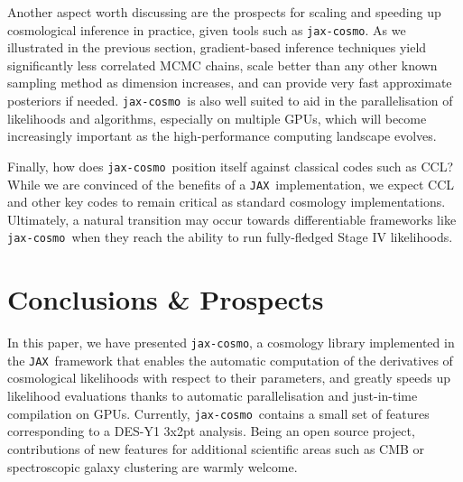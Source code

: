 \documentclass[twocolumn,twocolappendix,nofootinbib,iop]{openjournal}
\newcommand{\jaxcosmo}{\texttt{jax-cosmo}}
\newcommand{\jax}{\texttt{JAX}}
\begin{document}
\bigskip


Another aspect worth discussing are the prospects for scaling and speeding up cosmological inference in practice, given tools such as \jaxcosmo. As we illustrated in the previous section, gradient-based inference techniques yield significantly less correlated MCMC chains, scale better than any other known sampling method as dimension increases, and can provide very fast approximate posteriors if needed. \jaxcosmo\  is also well suited to aid in the parallelisation of likelihoods and algorithms, especially on multiple GPUs, which will become increasingly important as the high-performance computing landscape evolves.



\bigskip

Finally, how does \jaxcosmo\ position itself against classical codes such as CCL?  While we are convinced of the benefits of a \jax\ implementation, we expect CCL and other key codes to remain critical as standard cosmology implementations.  Ultimately, a natural transition may occur towards differentiable frameworks like \jaxcosmo\ when they reach the ability to run fully-fledged Stage IV likelihoods.


\section{Conclusions \& Prospects}
\label{sec-conclusion}

In this paper, we have presented \jaxcosmo, a cosmology library implemented in the \jax\ framework that enables the automatic computation of the derivatives of cosmological likelihoods with respect to their parameters, and greatly speeds up likelihood evaluations thanks to automatic parallelisation and just-in-time compilation on GPUs. Currently, \jaxcosmo\ contains a small set of features corresponding to a DES-Y1 3x2pt analysis. Being an open source project, contributions of new features for additional scientific areas such as CMB or spectroscopic galaxy clustering are warmly welcome. 
\end{document}
